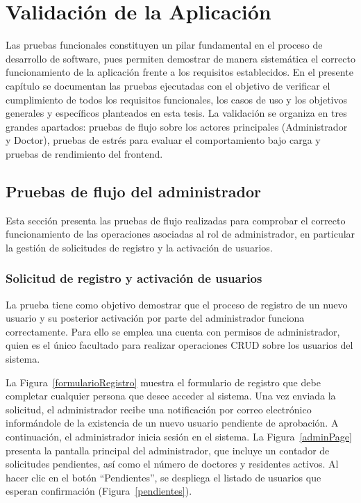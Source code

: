 \chapter{Validación de la Aplicación}

Las pruebas funcionales constituyen un pilar fundamental en el proceso de desarrollo de software, pues permiten demostrar de manera sistemática el correcto funcionamiento de la aplicación frente a los requisitos establecidos. En el presente capítulo se documentan las pruebas ejecutadas con el objetivo de verificar el cumplimiento de todos los requisitos funcionales, los casos de uso y los objetivos generales y específicos planteados en esta tesis. La validación se organiza en tres grandes apartados: pruebas de flujo sobre los actores principales (Administrador y Doctor), pruebas de estrés para evaluar el comportamiento bajo carga y pruebas de rendimiento del frontend.

\section{Pruebas de flujo del administrador}

Esta sección presenta las pruebas de flujo realizadas para comprobar el correcto funcionamiento de las operaciones asociadas al rol de administrador, en particular la gestión de solicitudes de registro y la activación de usuarios.

\subsection{Solicitud de registro y activación de usuarios}

La prueba tiene como objetivo demostrar que el proceso de registro de un nuevo usuario y su posterior activación por parte del administrador funciona correctamente. Para ello se emplea una cuenta con permisos de administrador, quien es el único facultado para realizar operaciones CRUD sobre los usuarios del sistema.

La Figura~\ref{formularioRegistro} muestra el formulario de registro que debe completar cualquier persona que desee acceder al sistema. Una vez enviada la solicitud, el administrador recibe una notificación por correo electrónico informándole de la existencia de un nuevo usuario pendiente de aprobación. A continuación, el administrador inicia sesión en el sistema. La Figura~\ref{adminPage} presenta la pantalla principal del administrador, que incluye un contador de solicitudes pendientes, así como el número de doctores y residentes activos. Al hacer clic en el botón “Pendientes”, se despliega el listado de usuarios que esperan confirmación (Figura~\ref{pendientes}).

